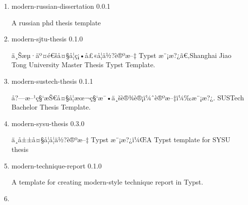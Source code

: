 \begin{enumerate}

  { modern-resume } { 0.1.0 }

  A modern resume/CV template.
\item
  \href{/universe/package/modern-russian-dissertation/}{}


  { modern-russian-dissertation } { 0.0.1 }

  A russian phd thesis template
\item
  \href{/universe/package/modern-sjtu-thesis/}{}


  { modern-sjtu-thesis } { 0.1.0 }

  ä¸Šæµ·äº¤é€šå¤§å­¦ç¡•å£«å­¦ä½?è®ºæ--‡ Typst æ¨¡æ?¿ã€‚Shanghai Jiao Tong
  University Master Thesis Typst Template.
\item
  \href{/universe/package/modern-sustech-thesis/}{}


  { modern-sustech-thesis } { 0.1.1 }

  å?---æ--¹ç§`æŠ€å¤§å­¦æœ¬ç§`æ¯•ä¸šè®¾è®¡ï¼ˆè®ºæ--‡ï¼‰æ¨¡æ?¿. SUSTech
  Bachelor Thesis Template.
\item
  \href{/universe/package/modern-sysu-thesis/}{}


  { modern-sysu-thesis } { 0.3.0 }

  ä¸­å±±å¤§å­¦å­¦ä½?è®ºæ--‡ Typst æ¨¡æ?¿ï¼ŒA Typst template for SYSU thesis
\item
  \href{/universe/package/modern-technique-report/}{}


  { modern-technique-report } { 0.1.0 }

  A template for creating modern-style technique report in Typst.
\item
  \href{/universe/package/modern-uit-thesis/}{}


\end{enumerate}
